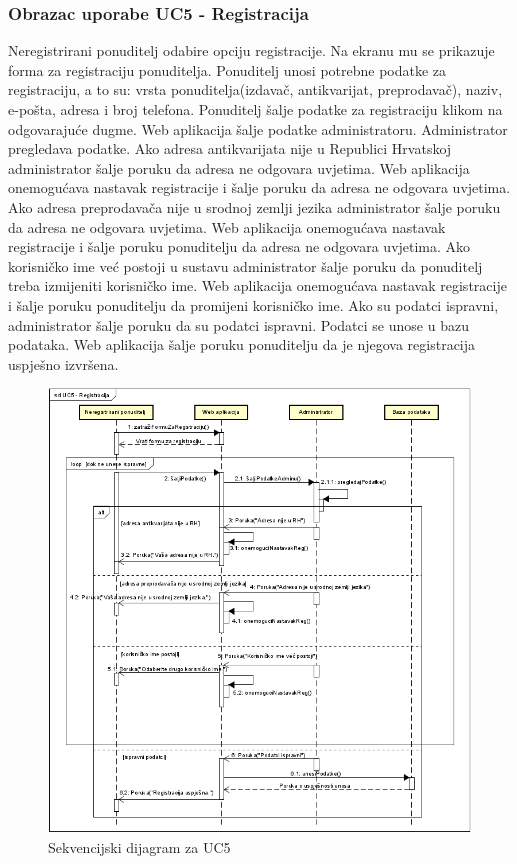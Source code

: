 			\subsubsection{Obrazac uporabe UC5 - Registracija}
			Neregistrirani ponuditelj odabire opciju registracije. Na ekranu mu se prikazuje forma za registraciju ponuditelja. Ponuditelj unosi potrebne podatke za registraciju, a to su: vrsta ponuditelja(izdavač, antikvarijat, preprodavač), naziv, e-pošta, adresa i broj telefona. Ponuditelj šalje podatke za registraciju klikom na odgovarajuće dugme. Web aplikacija šalje podatke administratoru. Administrator pregledava podatke. Ako adresa antikvarijata nije u Republici Hrvatskoj administrator šalje poruku da adresa ne odgovara uvjetima. Web aplikacija onemogućava nastavak registracije i šalje poruku da adresa ne odgovara uvjetima. Ako adresa preprodavača nije u srodnoj zemlji jezika administrator šalje poruku da adresa ne odgovara uvjetima. Web aplikacija onemogućava nastavak registracije i šalje poruku ponuditelju da adresa ne odgovara uvjetima. Ako korisničko ime već postoji u sustavu administrator šalje poruku da ponuditelj treba izmijeniti korisničko ime. Web aplikacija onemogućava nastavak registracije i šalje poruku ponuditelju da promijeni korisničko ime. Ako su podatci ispravni, administrator šalje poruku da su podatci ispravni. Podatci se unose u bazu podataka. Web aplikacija šalje poruku ponuditelju da je njegova registracija uspješno izvršena.
			
			\eject
			
				\begin{figure}[H]
					\includegraphics[width=\textwidth]{dijagrami/SequenceDiagram2.PNG} %
					\centering
					\caption{Sekvencijski dijagram za UC5}
					\label{fig:seqdiag2}
				\end{figure}
			
